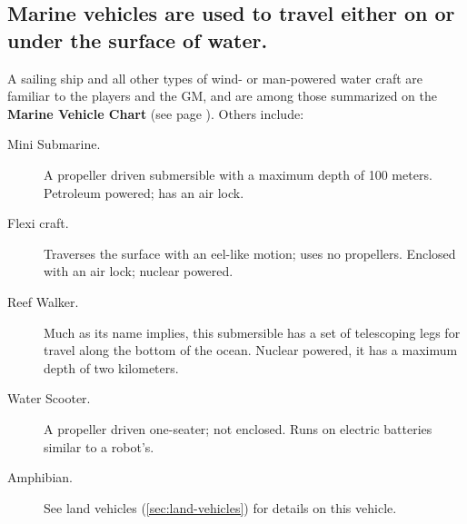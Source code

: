 \subsection[Marine Vehicles]{Marine vehicles are used to travel
  either on or under the surface of water.}
\label{sec:marine-vehicles}

A sailing ship and all other types of 
wind- or man-powered water craft\label{sec:marine-vehicles-hyphens-1}
are familiar to the players and the GM, and are among those summarized
on the \textbf{Marine Vehicle Chart} (see page
\pageref{tab:marine-vehicles}). Others include:

\begin{description}
\item[Mini Submarine.] A propeller driven submersible with a maximum
  depth of 100 meters. Petroleum powered; has an air lock.
\item[Flexi craft.] Traverses the surface with an eel-like motion;
  uses no propellers. Enclosed with an air lock; nuclear powered.
\item[Reef Walker.] Much as its name implies, this submersible has a
  set of telescoping legs for travel along the bottom of the ocean.
  Nuclear powered, it has a maximum depth of two kilometers.
\item[Water Scooter.] A propeller driven one-seater; not enclosed.
  Runs on electric batteries similar to a robot's.
\item[Amphibian.] See land vehicles (\ref{sec:land-vehicles}) for
  details on this vehicle.
\end{description}

